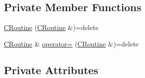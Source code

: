 \subsection*{Private Member Functions}
\begin{DoxyCompactItemize}
\item 
\hyperlink{classapollo_1_1cyber_1_1croutine_1_1CRoutine_a7dc0fef4185513d49373bc93566fc033}{C\-Routine} (\hyperlink{classapollo_1_1cyber_1_1croutine_1_1CRoutine}{C\-Routine} \&)=delete
\item 
\hyperlink{classapollo_1_1cyber_1_1croutine_1_1CRoutine}{C\-Routine} \& \hyperlink{classapollo_1_1cyber_1_1croutine_1_1CRoutine_addd133a708f590f95e39df3fb8cb10f2}{operator=} (\hyperlink{classapollo_1_1cyber_1_1croutine_1_1CRoutine}{C\-Routine} \&)=delete
\end{DoxyCompactItemize}
\subsection*{Private Attributes}
